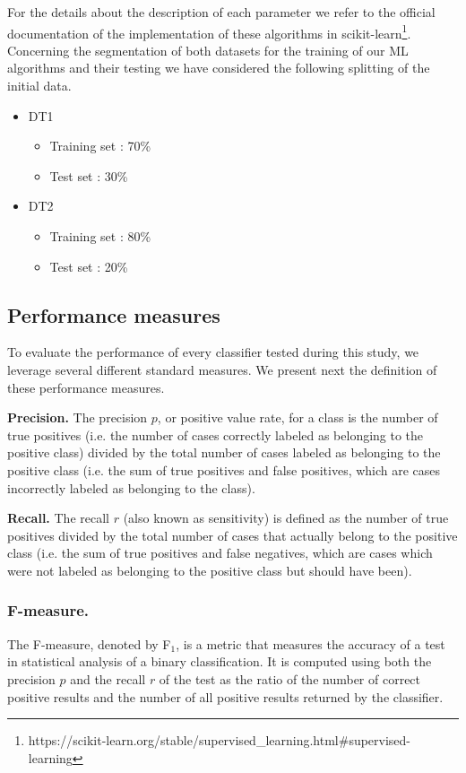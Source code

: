For the details about the description of each parameter we refer to the official documentation of the implementation of these algorithms in scikit-learn\footnote{https://scikit-learn.org/stable/supervised\_learning.html\#supervised-learning}. Concerning the segmentation of both datasets for the 
training of our ML algorithms and their testing we have considered the following splitting of the initial data.
\begin{itemize}
    \item DT1
    \begin{itemize}
        \item Training set : 70\%
        \item Test set : 30\%
    \end{itemize}
    \item DT2
    \begin{itemize}
        \item Training set : 80\%
        \item Test set : 20\%
    \end{itemize}
\end{itemize}

\subsection{Performance measures}
To evaluate the performance of every classifier tested during this study, we leverage several different standard measures. We present next the definition of these performance measures.

\textbf{Precision.} 
The precision $p$, or positive value rate, for a class is the number
 of true positives (i.e. the number of cases  correctly labeled as belonging to the positive class)
 divided by the total number of cases labeled as belonging to the positive class (i.e. the sum of true positives 
and false positives, which are cases  incorrectly labeled as belonging to the class).

\textbf{ Recall.}
The recall $r$ (also known as sensitivity) is defined as the number of true positives divided by the total number of cases that actually belong
 to the positive class (i.e. the sum of true positives and false negatives, which are cases which were not labeled as belonging to the positive class but should have been).


\subsubsection*{\bf F-measure.} The F-measure, denoted by F$_1$, is a metric that measures the accuracy of a test in statistical analysis of a binary classification.
It is computed using both the precision $p$ and the recall $r$ of the test as the ratio of the number of correct positive results and the
number of all positive results returned by the classifier. 


